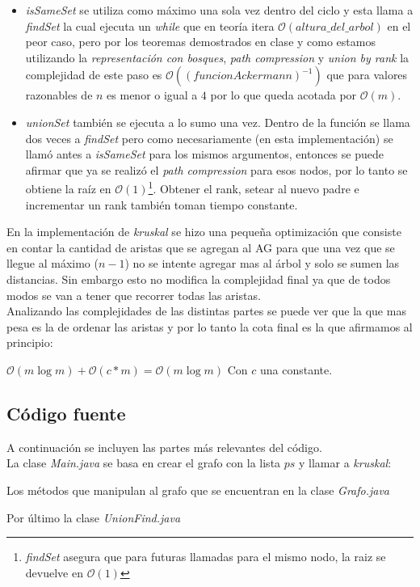 \begin{itemize}
	\item \textit{isSameSet} se utiliza como máximo una sola vez dentro del ciclo y esta llama a \textit{findSet} la cual ejecuta un \emph{while} que en teoría itera $\mathcal{O}(altura\_del\_arbol)$ en el peor caso, pero por los teoremas demostrados en clase y como estamos utilizando la \emph{representación con bosques}, \emph{path compression} y \emph{union by rank} la complejidad de este paso es $\mathcal{O}((funcionAckermann)^{-1})$ que para valores razonables de $n$ es menor o igual a $4$ por lo que queda acotada por $\mathcal{O}(m)$.
	\item \textit{unionSet} también se ejecuta a lo sumo una vez. Dentro de la función se llama dos veces a \textit{findSet} pero como necesariamente (en esta implementación) se llamó antes a \textit{isSameSet} para los mismos argumentos, entonces se puede afirmar que ya se realizó el \emph{path compression} para esos nodos, por lo tanto se obtiene la raíz en $\mathcal{O}(1)$\footnote{\textit{findSet} asegura que para futuras llamadas para el mismo nodo, la raiz se devuelve en $\mathcal{O}(1)$}. Obtener el rank, setear al nuevo padre e incrementar un rank también toman tiempo constante. \label{union} 
\end{itemize}

En la implementación de \textit{kruskal} se hizo una pequeña optimización que consiste en contar la cantidad de aristas que se agregan al AG para que una vez que se llegue al máximo ($n-1$) no se intente agregar mas al árbol y solo se sumen las distancias. Sin embargo esto no modifica la complejidad final ya que de todos modos se van a tener que recorrer todas las aristas.\\

Analizando las complejidades de las distintas partes se puede ver que la que mas pesa es la de ordenar las aristas y por lo tanto la cota final es la que afirmamos al principio:

\begin{center}
	$\mathcal{O}(m\log{}m) + \mathcal{O}(c*m) = \mathcal{O}(m\log{}m)$ Con $c$ una constante.
\end{center}

\subsection{Código fuente}

A continuación se incluyen las partes más relevantes del código.\\
La clase \emph{Main.java} se basa en crear el grafo con la lista $ps$ y llamar a \textit{kruskal}:

Los métodos que manipulan al grafo que se encuentran en la clase \emph{Grafo.java}

Por último la clase \emph{UnionFind.java}


